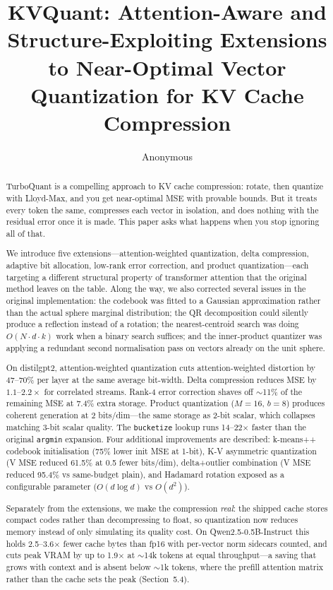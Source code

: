 \documentclass[11pt]{article}
\title{\textbf{KVQuant}: Attention-Aware and Structure-Exploiting Extensions\\
to Near-Optimal Vector Quantization for KV Cache Compression}
\author{Anonymous}
\date{}
\begin{document}
\maketitle

\begin{abstract}
TurboQuant \citep{zandieh2025} is a compelling approach to KV cache
compression: rotate, then quantize with Lloyd-Max, and you get near-optimal
MSE with provable bounds. But it treats every token the same, compresses
each vector in isolation, and does nothing with the residual error once it is
made. This paper asks what happens when you stop ignoring all of that.

We introduce five extensions---attention-weighted quantization, delta
compression, adaptive bit allocation, low-rank error correction, and
product quantization---each targeting a different structural property of
transformer attention that the original method leaves on the table. Along
the way, we also corrected several issues in the original implementation: the
codebook was fitted to a Gaussian approximation rather than the actual sphere
marginal distribution; the QR decomposition could silently produce a
reflection instead of a rotation; the nearest-centroid search was doing
$O(N \cdot d \cdot k)$ work when a binary search suffices; and the
inner-product quantizer was applying a redundant second normalisation pass on
vectors already on the unit sphere.

On distilgpt2, attention-weighted quantization cuts attention-weighted
distortion by 47--70\% per layer at the same average bit-width. Delta
compression reduces MSE by $1.1$--$2.2\times$ for correlated streams.
Rank-4 error correction shaves off $\sim$11\% of the remaining MSE at 7.4\%
extra storage. Product quantization ($M{=}16$, $b{=}8$) produces coherent
generation at 2 bits/dim---the same storage as 2-bit scalar, which collapses
matching 3-bit scalar quality. The \texttt{bucketize} lookup runs 14--22$\times$
faster than the original \texttt{argmin} expansion. Four additional
improvements are described: k-means++ codebook initialisation (75\% lower
init MSE at 1-bit), K-V asymmetric quantization (V MSE reduced 61.5\% at
0.5 fewer bits/dim), delta+outlier combination (V MSE reduced 95.4\% vs
same-budget plain), and Hadamard rotation exposed as a configurable parameter
($O(d \log d)$ vs $O(d^2)$).

Separately from the extensions, we make the compression \emph{real}: the
shipped cache stores compact codes rather than decompressing to float, so
quantization now reduces memory instead of only simulating its quality cost.
On Qwen2.5-0.5B-Instruct this holds 2.5--3.6$\times$ fewer cache bytes than
fp16 with per-vector norm sidecars counted, and cuts peak VRAM by up to
1.9$\times$ at $\sim$14k tokens at equal throughput---a saving that grows
with context and is absent below $\sim$1k tokens, where the prefill attention
matrix rather than the cache sets the peak (Section~5.4).


\end{abstract}
\end{document}
